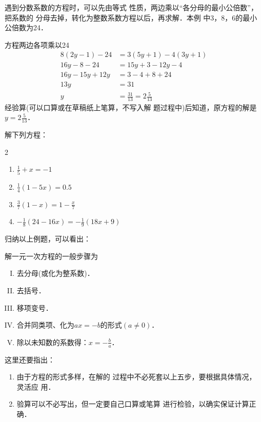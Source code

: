 \begin{analyze}
   遇到分数系数的方程时，可以先由等式
    性质，两边乘以“各分母的最小公倍数”，把系数的
    分母去掉，转化为整数系数方程以后，再求解．本例
    中3，8，6的最小公倍数为24．
\end{analyze}

\begin{solution}
    方程两边各项乘以24
 \begin{align*}
    8 (2y-1)-24&=3 (5y+1)-4 (3y+1)  \tag{去分母}\\
    16y-8-24&=15y + 3-12y-4  \tag{去括号}\\
    16y-15y+12y&=3-4+8+24  \tag{移项}\\
    13y&=31    \tag{合并同类项}\\
    y&=\frac{31}{13}=2\frac{5}{13} \tag{两边除以13}
 \end{align*}   
 经验算(可以口算或在草稿纸上笔算，不写入解
 题过程中)后知道，原方程的解是$y=2\frac{5}{13}$．
\end{solution}

\begin{ex}
解下列方程：
\begin{multicols}{2}
\begin{enumerate}
    \item $\frac{1}{5}+x=-1$
    \item $\frac{1}{4}(1-5x)=0.5$
    \item $\frac{3}{7}(1-x)=1-\frac{x}{7}$
    \item $-\frac{1}{8}(24-16x)=-\frac{1}{9}(18x+9)$
\end{enumerate}
\end{multicols}
\end{ex}

归纳以上例题，可以看出：
\begin{blk}{}
    解一元一次方程的一般步骤为
    \begin{enumerate}[I.]
        \item 去分母(或化为整系数)．
        \item 去括号．
        \item 移项变号．
        \item 合并同类项、化为$ax=-b$的形式$(a\ne 0)$．
        \item 除以未知数的系数得：$x=-\frac{b}{a}$．
    \end{enumerate}
\end{blk}
      
这里还要指出：
\begin{enumerate}
    \item 由于方程的形式多样，在解的
过程中不必死套以上五步，要根据具体情况，灵活应
用．
\item 验算可以不必写出，但一定要自己口算或笔算
进行检验，以确实保证计算正确．
\end{enumerate}

